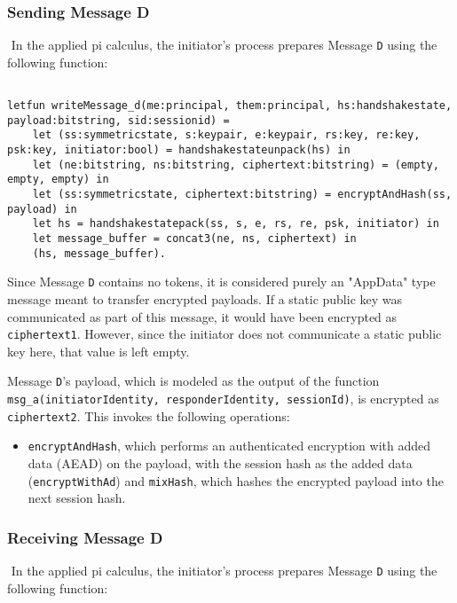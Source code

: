 \subsubsection{Sending Message D}$ $
In the applied pi calculus, the initiator's process prepares Message \texttt{D} using the following function:


\begin{lstlisting}

letfun writeMessage_d(me:principal, them:principal, hs:handshakestate, payload:bitstring, sid:sessionid) =
	let (ss:symmetricstate, s:keypair, e:keypair, rs:key, re:key, psk:key, initiator:bool) = handshakestateunpack(hs) in
	let (ne:bitstring, ns:bitstring, ciphertext:bitstring) = (empty, empty, empty) in
	let (ss:symmetricstate, ciphertext:bitstring) = encryptAndHash(ss, payload) in
	let hs = handshakestatepack(ss, s, e, rs, re, psk, initiator) in
	let message_buffer = concat3(ne, ns, ciphertext) in
	(hs, message_buffer).

\end{lstlisting}

Since Message \texttt{D} contains no tokens, it is considered purely an "AppData" type message meant to transfer encrypted payloads.
If a static public key was communicated as part of this message, it would have been encrypted as \texttt{ciphertext1}. However, since the initiator does not communicate a static public key here, that value is left empty.


Message \texttt{D}'s payload, which is modeled as the output of the function \texttt{msg\_a(initiatorIdentity, responderIdentity, sessionId)}, is encrypted as \texttt{ciphertext2}. This invokes the following operations:


\begin{itemize}

\item \texttt{encryptAndHash}, which performs an authenticated encryption with added data (AEAD) on the payload, with the session hash as the added data (\texttt{encryptWithAd}) and \texttt{mixHash}, which hashes the encrypted payload into the next session hash.

\end{itemize}
\subsubsection{Receiving Message D}$ $
In the applied pi calculus, the initiator's process prepares Message \texttt{D} using the following function:


